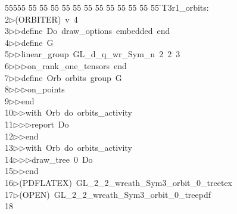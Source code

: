 %
%
\begin{tabbing}
55555 \= 55 \= 55 \= 55 \= 55 \= 55 \= 55 \= 55 \= 55 \= 55 \= 55 \= 55 \= 55 \= \>T3r1\_orbits:\\[0pt]
2\>$\triangleright$\>(ORBITER)\ v\ 4\ \\[0pt]
3\>$\triangleright$\>$\triangleright$\>define\ Do\ draw\_options\ embedded\ end\ \\[0pt]
4\>$\triangleright$\>$\triangleright$\>define\ G\ \\[0pt]
5\>$\triangleright$\>$\triangleright$\>linear\_group\ GL\_d\_q\_wr\_Sym\_n\ 2\ 2\ 3\ \\[0pt]
6\>$\triangleright$\>$\triangleright$\>$\triangleright$\>on\_rank\_one\_tensors\ end\ \\[0pt]
7\>$\triangleright$\>$\triangleright$\>define\ Orb\ orbits\ group\ G\ \\[0pt]
8\>$\triangleright$\>$\triangleright$\>$\triangleright$\>on\_points\ \\[0pt]
9\>$\triangleright$\>$\triangleright$\>end\ \\[0pt]
10\>$\triangleright$\>$\triangleright$\>with\ Orb\ do\ orbits\_activity\ \\[0pt]
11\>$\triangleright$\>$\triangleright$\>$\triangleright$\>report\ Do\ \\[0pt]
12\>$\triangleright$\>$\triangleright$\>end\ \\[0pt]
13\>$\triangleright$\>$\triangleright$\>with\ Orb\ do\ orbits\_activity\ \\[0pt]
14\>$\triangleright$\>$\triangleright$\>$\triangleright$\>draw\_tree\ 0\ Do\ \\[0pt]
15\>$\triangleright$\>$\triangleright$\>end\\[0pt]
16\>$\triangleright$\>(PDFLATEX)\ GL\_2\_2\_wreath\_Sym3\_orbit\_0\_treetex\\[0pt]
17\>$\triangleright$\>(OPEN)\ GL\_2\_2\_wreath\_Sym3\_orbit\_0\_treepdf\\[0pt]
18\>\end{tabbing}
